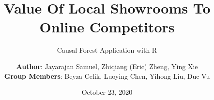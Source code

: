 \documentclass[mathserif, xcolor=table]{beamer}
\title{Value Of Local Showrooms To Online Competitors}
\subtitle{Causal Forest Application with R}
\author{\textbf{Author}: Jayarajan Samuel, Zhiqiang (Eric) Zheng, Ying Xie \\ 
{\footnotesize \textbf{Group Members}: Beyza Celik, Luoying Chen, Yihong Liu, Duc Vu}}
\institute[] %
{  
%  
%  
}
\date{October 23, 2020}
\begin{document}
\begin{frame}
  \titlepage
\end{frame}


\end{document}
